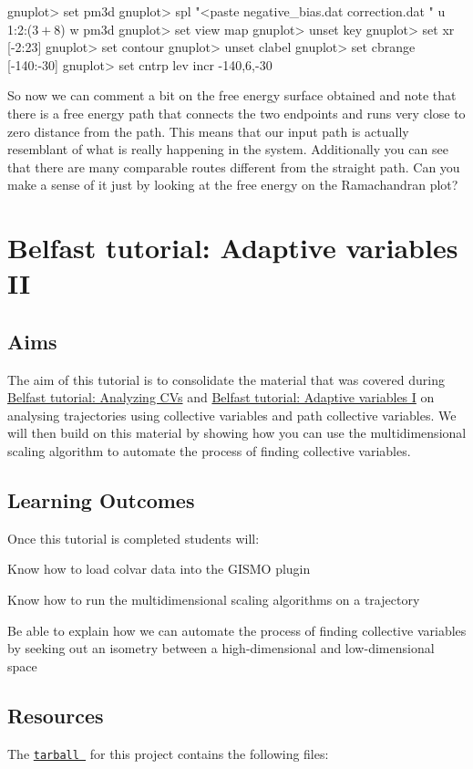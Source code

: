 \begin{DoxyVerb}gnuplot> set pm3d
gnuplot> spl "<paste negative_bias.dat correction.dat " u 1:2:($3+$8) w pm3d
gnuplot> set view map
gnuplot> unset key
gnuplot> set xr [-2:23]
gnuplot> set contour
gnuplot> unset clabel
gnuplot> set cbrange [-140:-30] 
gnuplot> set cntrp lev incr -140,6,-30
\end{DoxyVerb}


\label{belfast-2_belfast-2-metadpath-free-fig}%
\hypertarget{belfast-2_belfast-2-metadpath-free-fig}{}%
 So now we can comment a bit on the free energy surface obtained and note that there is a free energy path that connects the two endpoints and runs very close to zero distance from the path. This means that our input path is actually resemblant of what is really happening in the system. Additionally you can see that there are many comparable routes different from the straight path. Can you make a sense of it just by looking at the free energy on the Ramachandran plot? \hypertarget{belfast-3}{}\section{Belfast tutorial\+: Adaptive variables I\+I}\label{belfast-3}
\hypertarget{belfast-10_Aims}{}\subsection{Aims}\label{belfast-10_Aims}
The aim of this tutorial is to consolidate the material that was covered during \hyperlink{belfast-1}{Belfast tutorial\+: Analyzing C\+Vs} and \hyperlink{belfast-2}{Belfast tutorial\+: Adaptive variables I} on analysing trajectories using collective variables and path collective variables. We will then build on this material by showing how you can use the multidimensional scaling algorithm to automate the process of finding collective variables.\hypertarget{belfast-3_belfast-3-lo}{}\subsection{Learning Outcomes}\label{belfast-3_belfast-3-lo}
Once this tutorial is completed students will\+:


\begin{DoxyItemize}
\item Know how to load colvar data into the G\+I\+S\+M\+O plugin
\item Know how to run the multidimensional scaling algorithms on a trajectory
\item Be able to explain how we can automate the process of finding collective variables by seeking out an isometry between a high-\/dimensional and low-\/dimensional space
\end{DoxyItemize}\hypertarget{belfast-10_Resources}{}\subsection{Resources}\label{belfast-10_Resources}
The \href{tutorial-resources/belfast-3.tar.gz}{\tt tarball } for this project contains the following files\+:


